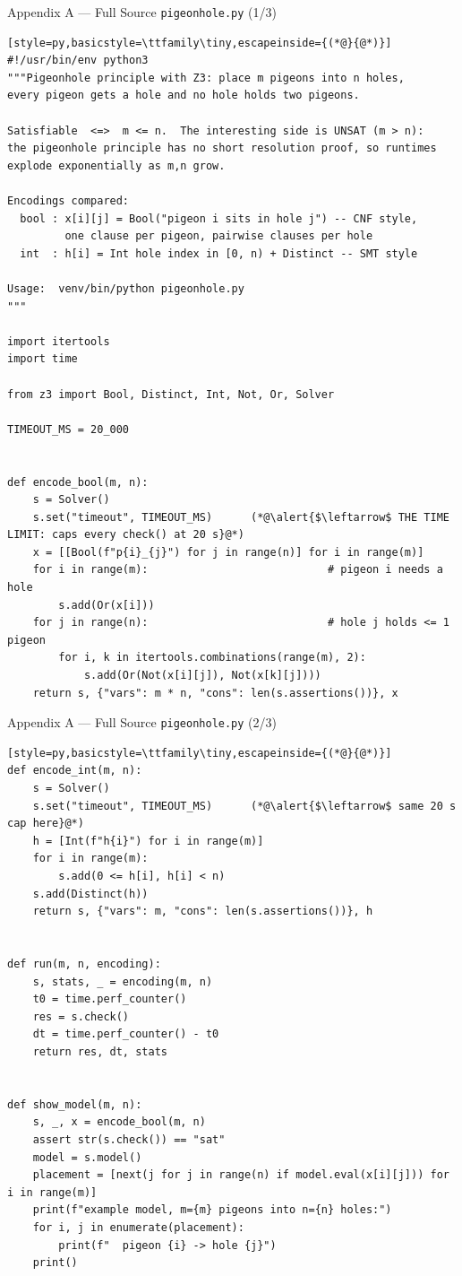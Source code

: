 \documentclass[10pt,aspectratio=169,xcolor={table}]{beamer}
\begin{document}
\begin{frame}[fragile]{Appendix A --- Full Source \texttt{pigeonhole.py} (1/3)}
\begin{lstlisting}[style=py,basicstyle=\ttfamily\tiny,escapeinside={(*@}{@*)}]
#!/usr/bin/env python3
"""Pigeonhole principle with Z3: place m pigeons into n holes,
every pigeon gets a hole and no hole holds two pigeons.

Satisfiable  <=>  m <= n.  The interesting side is UNSAT (m > n):
the pigeonhole principle has no short resolution proof, so runtimes
explode exponentially as m,n grow.

Encodings compared:
  bool : x[i][j] = Bool("pigeon i sits in hole j") -- CNF style,
         one clause per pigeon, pairwise clauses per hole
  int  : h[i] = Int hole index in [0, n) + Distinct -- SMT style

Usage:  venv/bin/python pigeonhole.py
"""

import itertools
import time

from z3 import Bool, Distinct, Int, Not, Or, Solver

TIMEOUT_MS = 20_000


def encode_bool(m, n):
    s = Solver()
    s.set("timeout", TIMEOUT_MS)      (*@\alert{$\leftarrow$ THE TIME LIMIT: caps every check() at 20 s}@*)
    x = [[Bool(f"p{i}_{j}") for j in range(n)] for i in range(m)]
    for i in range(m):                            # pigeon i needs a hole
        s.add(Or(x[i]))
    for j in range(n):                            # hole j holds <= 1 pigeon
        for i, k in itertools.combinations(range(m), 2):
            s.add(Or(Not(x[i][j]), Not(x[k][j])))
    return s, {"vars": m * n, "cons": len(s.assertions())}, x
\end{lstlisting}
\end{frame}

\begin{frame}[fragile]{Appendix A --- Full Source \texttt{pigeonhole.py} (2/3)}
\begin{lstlisting}[style=py,basicstyle=\ttfamily\tiny,escapeinside={(*@}{@*)}]
def encode_int(m, n):
    s = Solver()
    s.set("timeout", TIMEOUT_MS)      (*@\alert{$\leftarrow$ same 20 s cap here}@*)
    h = [Int(f"h{i}") for i in range(m)]
    for i in range(m):
        s.add(0 <= h[i], h[i] < n)
    s.add(Distinct(h))
    return s, {"vars": m, "cons": len(s.assertions())}, h


def run(m, n, encoding):
    s, stats, _ = encoding(m, n)
    t0 = time.perf_counter()
    res = s.check()
    dt = time.perf_counter() - t0
    return res, dt, stats


def show_model(m, n):
    s, _, x = encode_bool(m, n)
    assert str(s.check()) == "sat"
    model = s.model()
    placement = [next(j for j in range(n) if model.eval(x[i][j])) for i in range(m)]
    print(f"example model, m={m} pigeons into n={n} holes:")
    for i, j in enumerate(placement):
        print(f"  pigeon {i} -> hole {j}")
    print()
\end{lstlisting}
\end{frame}
\end{document}
